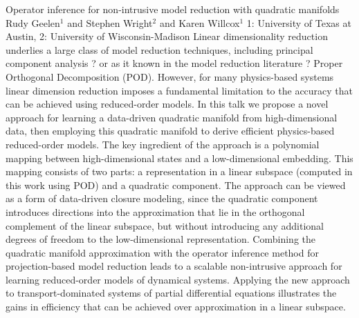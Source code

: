 \begin{addmargin}[2em]{0em}
\vspace{2ex}
\abs
{Operator inference for non-intrusive model reduction with quadratic manifolds}
{Rudy Geelen$^{1}$ and Stephen Wright$^{2}$ and Karen Willcox$^{1}$}
{1: University of Texas at Austin, 2: University of Wisconsin-Madison}
{Linear dimensionality reduction underlies a large class of model reduction techniques, including principal component analysis ? or as it known in the model reduction literature ? Proper Orthogonal Decomposition (POD). However, for many physics-based systems linear dimension reduction imposes a fundamental limitation to the accuracy that can be achieved using reduced-order models. In this talk we propose a novel approach for learning a data-driven quadratic manifold from high-dimensional data, then employing this quadratic manifold to derive efficient physics-based reduced-order models. The key ingredient of the approach is a polynomial mapping between high-dimensional states and a low-dimensional embedding. This mapping consists of two parts: a representation in a linear subspace (computed in this work using POD) and a quadratic component. The approach can be viewed as a form of data-driven closure modeling, since the quadratic component introduces directions into the approximation that lie in the orthogonal complement of the linear subspace, but without introducing any additional degrees of freedom to the low-dimensional representation. Combining the quadratic manifold approximation with the operator inference method for projection-based model reduction leads to a scalable non-intrusive approach for learning reduced-order models of dynamical systems. Applying the new approach to transport-dominated systems of partial differential equations illustrates the gains in efficiency that can be achieved over approximation in a linear subspace.}



\end{addmargin}
